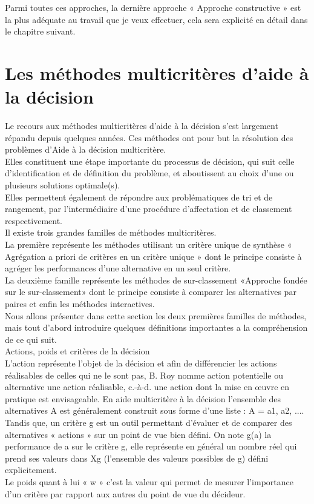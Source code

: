 Parmi toutes ces approches, la dernière approche « Approche constructive » est la plus adéquate au travail que je veux effectuer, cela sera explicité en détail dans le chapitre suivant.

\section{Les méthodes multicritères d’aide à la décision}
Le recours aux méthodes multicritères d’aide à la décision s’est largement répandu depuis quelques années. Ces méthodes ont pour but la résolution des problèmes d'Aide à la décision multicritère. \\Elles constituent une étape importante du processus de décision, qui suit celle d'identification et de définition du problème, et aboutissent au choix d'une ou plusieurs solutions optimale(s).\\
Elles permettent également de répondre aux problématiques de tri et de rangement, par l'intermédiaire d'une procédure d'affectation et de classement respectivement.\\
Il existe trois grandes familles de méthodes multicritères. \\La première représente les méthodes utilisant un critère unique de synthèse « Agrégation a priori de critères en un critère unique » dont le principe consiste à agréger les performances d’une alternative en un seul critère. \\La deuxième famille représente les méthodes de sur-classement «Approche fondée sur le sur-classement» dont le principe consiste à comparer les alternatives par paires et enfin les méthodes interactives.\\ 
Nous allons présenter dans cette section les deux premières familles de méthodes, mais tout d’abord introduire quelques définitions importantes a la compréhension de ce qui suit.
\\
Actions, poids et critères de la décision\\
L’action représente l’objet de la décision et afin de différencier les actions réalisables de celles qui ne le sont pas, B. Roy nomme action potentielle ou alternative une action réalisable, c.-à-d. une action dont la mise en œuvre en pratique est envisageable. En aide multicritère à la décision l’ensemble des alternatives A est généralement construit sous forme d’une liste : A = {a1, a2, ...}.\\
Tandis que, un critère g est un outil permettant d’évaluer et de comparer des alternatives « actions » sur un point de vue bien défini. On note g(a) la performance de a sur le critère g, elle représente en général un nombre réel qui prend ses valeurs dans Xg (l’ensemble des valeurs possibles de g) défini explicitement.\\
Le poids quant à lui « w » c’est la valeur qui permet de mesurer l'importance d'un critère par rapport aux autres du point de vue du décideur.\\

